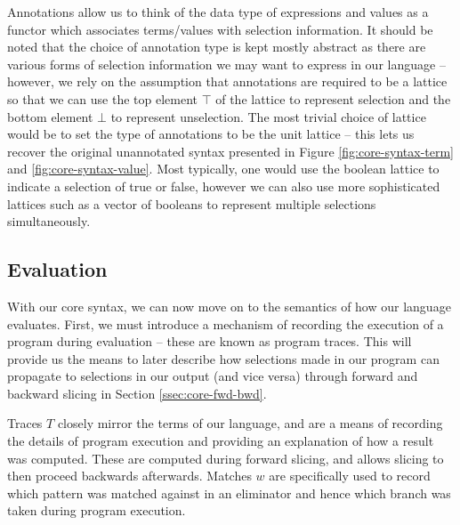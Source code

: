 Annotations allow us to think of the data type of expressions and values as a functor which associates terms/values with selection information. It should be noted that the choice of annotation type is kept mostly abstract as there are various forms of selection information we may want to express in our language -- however, we rely on the assumption that annotations are required to be a lattice so that we can use the top element $\top$ of the lattice to represent selection and the bottom element $\bot$ to represent unselection. The most trivial choice of lattice would be to set the type of annotations to be the unit lattice -- this lets us recover the original unannotated syntax presented in Figure \ref{fig:core-syntax-term} and \ref{fig:core-syntax-value}. Most typically, one would use the boolean lattice to indicate a selection of true or false, however we can also use more sophisticated lattices such as a vector of booleans to represent multiple selections simultaneously.


\subsection{Evaluation}

With our core syntax, we can now move on to the semantics of how our language evaluates. First, we must introduce a mechanism of recording the execution of a program during evaluation -- these are known as program traces. This will provide us the means to later describe how selections made in our program can propagate to selections in our output (and vice versa) through forward and backward slicing in Section \ref{ssec:core-fwd-bwd}.



Traces $T$ closely mirror the terms of our language, and are a means of recording the details of program execution and providing an explanation of how a result was computed. These are computed during forward slicing, and allows slicing to then proceed backwards afterwards. Matches $w$ are specifically used to record which pattern was matched against in an eliminator and hence which branch was taken during program execution. 


